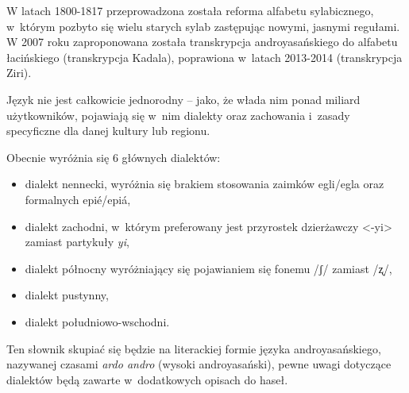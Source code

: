 \begin{spacing}{1.1}
W latach 1800-1817 przeprowadzona została reforma alfabetu sylabicznego, 
w~którym pozbyto się wielu starych sylab zastępując nowymi, jasnymi regułami. 
W 2007 roku zaproponowana została transkrypcja androyasańskiego do alfabetu 
łacińskiego (transkrypcja Kadala), poprawiona w~latach 2013-2014 (transkrypcja 
Ziri).

Język nie jest całkowicie jednorodny -- jako, że włada nim ponad miliard 
użytkowników, pojawiają się w~nim dialekty oraz zachowania i~zasady specyficzne 
dla danej kultury lub regionu. 

Obecnie wyróżnia się 6 głównych dialektów: 

\begin{itemize}
    \item dialekt nennecki, wyróżnia się brakiem stosowania zaimków egli/egla oraz formalnych epié/epiá,
    \item dialekt zachodni, w~którym preferowany jest przyrostek dzierżawczy <-yi> zamiast partykuły \emph{yi},
    \item dialekt północny wyróżniający się pojawianiem się fonemu /ʃ/ zamiast /ʐ/,
    \item dialekt pustynny,
    \item dialekt południowo-wschodni.
\end{itemize}

Ten słownik skupiać się będzie na literackiej formie języka androyasańskiego, 
nazywanej czasami \emph{ardo andro} (wysoki androyasański), pewne uwagi 
dotyczące dialektów będą zawarte w~dodatkowych opisach do haseł.

\end{spacing}